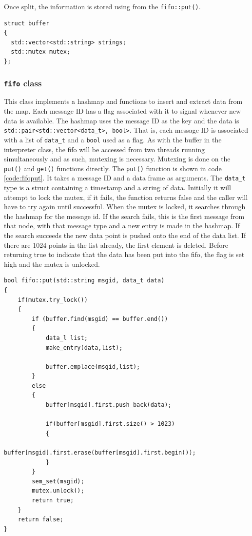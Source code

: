 Once split, the information is stored using from the \texttt{fifo::put()}. 
\begin{lstlisting}[caption=Buffer for holding incoming messages.,label=code:msgbuffer]
struct buffer 
{
  std::vector<std::string> strings;
  std::mutex mutex;
};
\end{lstlisting}
\subsubsection*{\texttt{fifo} class}
This class implements a hashmap and functions to insert and extract data from the map.
Each message ID has a flag associated with it to signal whenever new data is available.
The hashmap uses the message ID as the key and the data is \texttt{std::pair<std::vector<data\_t>, bool>}.
That is, each message ID is associated with a list of \texttt{data\_t} and a \texttt{bool} used as a flag.
As with the buffer in the interpreter class, the fifo will be accessed from two threads running simultaneously and as such, mutexing is necessary.
Mutexing is done on the \texttt{put()} and \texttt{get()} functions directly.
The \texttt{put()} function is shown in code \ref{code:fifoput}.
It takes a message ID and a data frame as arguments.
The \texttt{data\_t} type is a struct containing a timestamp and a string of data.
Initially it will attempt to lock the mutex, if it fails, the function returns false and the caller will have to try again until successful.
When the mutex is locked, it searches through the hashmap for the message id.
If the search fails, this is the first message from that node, with that message type and a new entry is made in the hashmap.
If the search succeeds the new data point is pushed onto the end of the data list.
If there are 1024 points in the list already, the first element is deleted.
Before returning true to indicate that the data has been put into the fifo, the flag is set high and the mutex is unlocked.

\begin{lstlisting}[caption=Function used to insert new data into the hashmap.,label=code:fifoput]
bool fifo::put(std::string msgid, data_t data)
{
	if(mutex.try_lock())
	{	
		if (buffer.find(msgid) == buffer.end())
		{
			data_l list;
			make_entry(data,list);

			buffer.emplace(msgid,list);
		}
		else
		{
			buffer[msgid].first.push_back(data);
			
			if(buffer[msgid].first.size() > 1023)
			{
				buffer[msgid].first.erase(buffer[msgid].first.begin());
			}
		}
		sem_set(msgid);
		mutex.unlock();
		return true;
	}
	return false;
}
\end{lstlisting}

